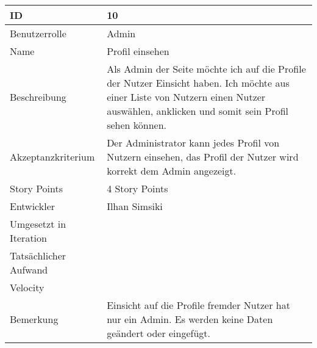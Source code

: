 \begin{tabularx}{\textwidth}{|p{}|X|}
	\hline
	ID & 10\\
	\hline
	Benutzerrolle & Admin\\
	\hline
	Name & Profil einsehen\\
	\hline
	Beschreibung & Als Admin der Seite möchte ich auf die Profile der Nutzer Einsicht haben. Ich möchte aus einer Liste von Nutzern einen Nutzer auswählen, anklicken und somit sein Profil sehen können. \\
	\hline
	Akzeptanzkriterium & Der Administrator kann jedes Profil von Nutzern einsehen, das Profil der Nutzer wird korrekt dem Admin angezeigt.\\
	\hline
	Story Points & 4 Story Points\\
	\hline
	Entwickler & Ilhan Simsiki\\
	\hline
	Umgesetzt in Iteration & \\
	\hline
	Tatsächlicher Aufwand & \\
	\hline
	Velocity & \\
	\hline
	Bemerkung & Einsicht auf die Profile fremder Nutzer hat nur ein Admin. Es werden keine Daten geändert oder eingefügt.\\
	\hline
\end{tabularx}
\vspace{20pt}
